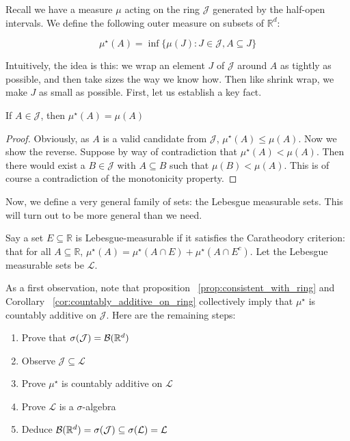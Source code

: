 Recall we have a measure $\mu$ acting on the ring $\mathcal J$ generated by 
the half-open intervals. We define the following outer measure on subsets of 
$\mathbb R^d$: 

\[ \mu^\star(A) = \inf\{ \mu(J) : J \in \mathcal J, A \subseteq J \}\]

Intuitively, the idea is this: we wrap an element $J$ of 
$\mathcal J$ around $A$ as tightly as possible, and then take sizes
 the way we know how. Then like shrink wrap, we make $J$ as small as possible. 
 First, let us establish a key fact. 

 \begin{Proposition} \label{prop:consistent_with_ring}
   If $A \in \mathcal J$, then $\mu^\star(A) = \mu(A)$
 \end{Proposition}

 \begin{proof} 
   Obviously, as $A$ is a valid candidate from 
   $\mathcal J$, $\mu^\star(A) \leq \mu(A)$. Now we show the reverse. 
   Suppose by way of contradiction that $\mu^\star(A) < \mu(A)$. Then there 
   would exist a $B \in \mathcal J$ with $A \subseteq B$ such that $\mu(B) < \mu(A)$. 
   This is of course a contradiction of the monotonicity property.
 \end{proof}

 Now, we define a very general family of sets: the Lebesgue measurable sets. This will 
 turn out to be more general than we need.

 \begin{definition}\label{def:lebesgue_measurable}
   Say a set $E \subseteq \mathbb R$ is Lebesgue-measurable if it satisfies the 
   Caratheodory criterion: that for all 
   $A \subseteq \mathbb R$, $\mu^\star(A) = \mu^\star(A \cap E) + \mu^\star(A \cap E^c)$. 
   Let the Lebesgue measurable sets be $\mathcal L$.
 \end{definition}

As a first observation, note that proposition ~\ref{prop:consistent_with_ring} and 
Corollary ~\ref{cor:countably_additive_on_ring} collectively imply that $\mu^\star$ is 
countably additive on $\mathcal J$. Here are the remaining steps: 

\begin{enumerate}
   \item Prove that $\sigma(\mathcal J) = \mathcal B(\mathbb R^d)$
   \item Observe $\mathcal J \subseteq \mathcal L$
   \item Prove $\mu^\star$ is countably additive on $\mathcal L$
   \item Prove $\mathcal L$ is a $\sigma$-algebra
   \item Deduce $\mathcal B(\mathbb R^d) = \sigma(\mathcal J) \subseteq \sigma(\mathcal L) = \mathcal L$
\end{enumerate}

